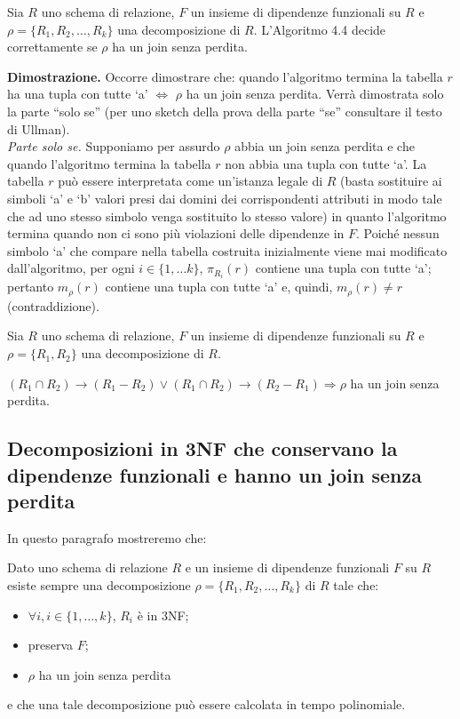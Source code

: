 \begin{theo}
Sia $R$ uno schema di relazione, $F$ un insieme di dipendenze funzionali su $R$ e $\rho =\{R_1, R_2, \ldots, R_k\}$
una decomposizione di $R$. L'Algoritmo 4.4 decide correttamente se $\rho$ ha un join senza perdita.
\end{theo}
\textbf{Dimostrazione.} Occorre dimostrare che: quando l'algoritmo termina la tabella $r$ ha una tupla con tutte `a' 
$\Leftrightarrow$ $\rho$ ha un join senza perdita. Verrà dimostrata solo la parte ``solo se'' (per uno sketch della 
prova della parte ``se'' consultare il testo di Ullman).\\
\emph{Parte solo se.} Supponiamo per assurdo $\rho$ abbia un join senza perdita e che quando l'algoritmo
termina la tabella $r$ non abbia una tupla con tutte `a'. La tabella $r$ può essere interpretata come
un'istanza legale di $R$ (basta sostituire ai simboli `a' e `b' valori presi dai domini dei corrispondenti
attributi in modo tale che ad uno stesso simbolo venga sostituito lo stesso valore) in quanto
l'algoritmo termina quando non ci sono più violazioni delle dipendenze in $F$. Poiché nessun
simbolo `a' che compare nella tabella costruita inizialmente viene mai modificato dall'algoritmo,
per ogni $i \in \{1, \ldots k\}$, $\pi_{R_i}(r)$ contiene una tupla con tutte `a'; pertanto $m_\rho(r)$ contiene una 
tupla con tutte `a' e, quindi, $m_\rho(r) \not= r$ (contraddizione).
\begin{cor}
Sia $R$ uno schema di relazione, $F$ un insieme di dipendenze funzionali su $R$ e $\rho = \{R_1, R_2\}$
una decomposizione di $R$.
\begin{center}
$(R_1 \cap R_2) \rightarrow (R_1 - R_2) \vee (R_1 \cap R_2) \rightarrow (R_2 -R_1) \Rightarrow \rho$ ha un join senza 
perdita.                            
\end{center}
\end{cor}

\subsection{Decomposizioni in 3NF che conservano la dipendenze funzionali e hanno un join senza perdita}

In questo paragrafo mostreremo che: 
\begin{prop}
Dato uno schema di relazione $R$ e un insieme di dipendenze funzionali $F$ su $R$ esiste sempre una decomposizione
$\rho = \{R_1, R_2, \ldots, R_k\}$ di $R$ tale che:
\begin{itemize}
 \item $\forall i, i \in \{1, \ldots, k\}$, $R_i$ è in 3NF;
 \item preserva $F$;
 \item $\rho$ ha un join senza perdita
\end{itemize}
e che una tale decomposizione può essere calcolata in tempo polinomiale. 
\end{prop}

